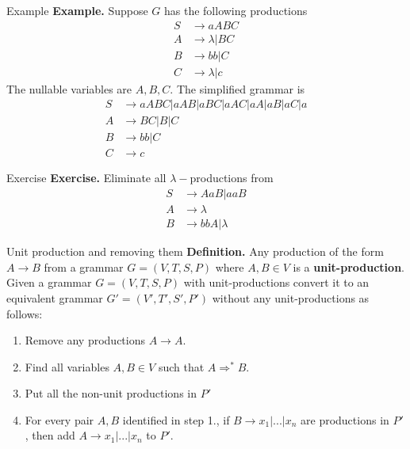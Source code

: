 \documentclass[10pt]{beamer}
\begin{document}
\begin{frame}{Example}
    \textbf{Example.} Suppose $G$ has the following productions
    \begin{align*}
        S & \rightarrow aABC        \\
        A & \rightarrow \lambda|BC  \\
        B & \rightarrow bb|C        \\
        C & \rightarrow \lambda | c
    \end{align*}
    The nullable variables are $A,B,C$. The simplified grammar is
    \begin{align*}
        S & \rightarrow aABC | aAB | aBC | aAC | aA | aB | aC | a \\
        A & \rightarrow BC | B | C                                \\
        B & \rightarrow bb | C                                    \\
        C & \rightarrow c
    \end{align*}
\end{frame}

\begin{frame}[t]{Exercise}
    \textbf{Exercise.} Eliminate all $\lambda-$productions from
    \begin{align*}
        S & \rightarrow AaB | aaB     \\
        A & \rightarrow \lambda       \\
        B & \rightarrow bbA | \lambda
    \end{align*}
\end{frame}

\begin{frame}{Unit production and removing them}
    \textbf{Definition.} Any production of the form $A \rightarrow B$ from a grammar $G = (V,T,S,P)$ where $A,B \in V$ is a \textbf{unit-production}.\\\bigskip
    Given a grammar $G = (V,T,S,P)$ with unit-productions convert it to an equivalent grammar $G' = (V', T', S', P')$ without any unit-productions as follows:
    \begin{enumerate}[1.]
        \item Remove any productions $A \rightarrow A$.
        \item Find all variables $A, B \in V$ such that $A \Rightarrow^* B$.
        \item Put all the non-unit productions in $P'$
        \item For every pair $A, B$ identified in step 1., if $B \rightarrow x_1 | ... | x_n$ are productions in \textbf{$P'$}, then add $A \rightarrow x_1 | ... | x_n$ to $P'$.
    \end{enumerate}

\end{frame}
\end{document}
